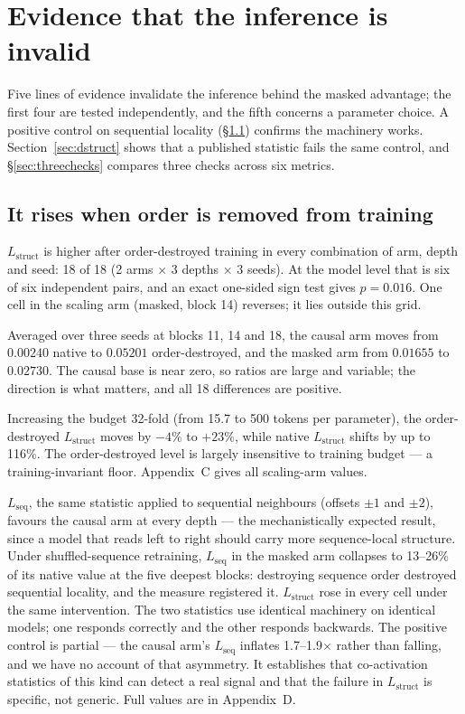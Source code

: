 \documentclass{article} %
\newcommand{\red}[1]{\textcolor{red}{#1}}
\newcommand{\opentag}[1]{\textcolor{red}{\textsuperscript{[\ref{#1}]}}}
\newcommand{\pend}[2]{\red{#1}\opentag{#2}}
\renewcommand{\red}[1]{#1}
\renewcommand{\opentag}[1]{}
\renewcommand{\pend}[2]{#1}
\newcommand{\Lstruct}{\ensuremath{L_{\mathrm{struct}}}}
\newcommand{\Lseq}{\ensuremath{L_{\mathrm{seq}}}}
\begin{document}
\section{Evidence that the inference is invalid}
\label{sec:invalid}

Five lines of evidence invalidate the inference behind the masked advantage; the first four are
tested independently, and the fifth concerns a parameter choice. A positive control on sequential
locality (\S\ref{sec:order}) confirms the machinery works. Section~\ref{sec:dstruct} shows that a
published statistic fails the same control, and \S\ref{sec:threechecks} compares three checks
across six metrics.

\subsection{It rises when order is removed from training}
\label{sec:order}

\Lstruct{} is higher after order-destroyed training in every combination of arm, depth and seed:
18 of 18 (2 arms $\times$ 3 depths $\times$ 3 seeds). At the model level that is six of six
independent pairs, and an exact one-sided sign test gives $p = 0.016$. One cell in the scaling arm
(masked, block 14) reverses; it lies outside this grid.

Averaged over three seeds at blocks 11, 14 and 18, the causal arm moves from $0.00240$ native to
$0.05201$ order-destroyed, and the masked arm from $0.01655$ to $0.02730$. The causal base is near
zero, so ratios are large and variable; the direction is what matters, and all 18 differences are
positive.

Increasing the budget 32-fold (from 15.7 to 500 tokens per parameter), the order-destroyed
\Lstruct{} moves by $-4$\% to $+23$\%, while native \Lstruct{} shifts by up to 116\%. The
order-destroyed level is largely insensitive to training budget --- a training-invariant floor.
Appendix~C gives all scaling-arm values.

\Lseq, the same statistic applied to sequential neighbours (offsets $\pm 1$ and $\pm 2$), favours
the causal arm at every depth --- the mechanistically expected result, since a model that reads
left to right should carry more sequence-local structure. \pend{Under shuffled-sequence
retraining, \Lseq{} in the masked arm collapses to 13--26\% of its native value at the five
deepest blocks}{c:lseq}: destroying sequence order destroyed sequential locality, and the measure
registered it. \Lstruct{} rose in every cell under the same intervention. The two statistics use
identical machinery on identical models; one responds correctly and the other responds backwards.
The positive control is partial --- \pend{the causal arm's \Lseq{} inflates 1.7--1.9$\times$
rather than falling}{c:lseq}, and we have no account of that asymmetry. It establishes that
co-activation statistics of this kind can detect a real signal and that the failure in \Lstruct{}
is specific, not generic. Full values are in Appendix~D.
\end{document}
